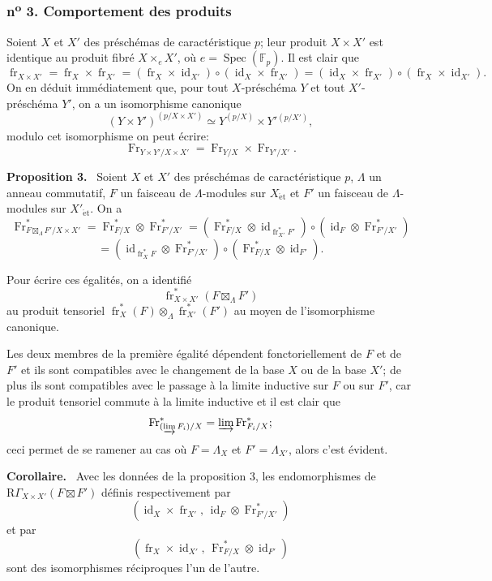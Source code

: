 \documentclass[11pt]{article}
\newenvironment{statement}[1]{\par\medskip\noindent\textbf{#1.}\ }{\par\medskip}
\DeclareMathOperator{\Spec}{Spec}
\newcommand{\R}{\mathrm{R}}\newcommand{\RHomCore}{\mathrm{RHom}}
\providecommand{\et}{\mathrm{\acute{e}t}}
\providecommand{\RGamma}{\R\Gamma}
\providecommand{\id}{\operatorname{id}}
\providecommand{\id}{\operatorname{id}}
\providecommand{\id}{\operatorname{id}}
\providecommand{\RGamma}{\R\Gamma}
\providecommand{\R}{\mathrm R}
\providecommand{\id}{\operatorname{id}}
\providecommand{\Spec}{\operatorname{Spec}}
\providecommand{\Spec}{\operatorname{Spec}}
\providecommand{\id}{\operatorname{id}}
\providecommand{\Spec}{\operatorname{Spec}}
\providecommand{\fr}{\operatorname{fr}}
\providecommand{\Fr}{\operatorname{Fr}}
\providecommand{\Fr}{\operatorname{Fr}}
\providecommand{\fr}{\operatorname{fr}}
\providecommand{\Spec}{\operatorname{Spec}}
\providecommand{\id}{\operatorname{id}}
\providecommand{\RGamma}{\R\Gamma}
\providecommand{\et}{\acute{e}t}
\providecommand{\boxt}{\boxtimes}
\begin{document}
\subsubsection*{n\textsuperscript{o} 3. Comportement des produits}

Soient $X$ et $X'$ des préschémas de caractéristique $p$; leur produit $X\times X'$ est identique au produit fibré $X\times_eX'$, où $e=\Spec(\mathbb F_p)$. Il est clair que
\[
\fr_{X\times X'}=\fr_X\times\fr_{X'}=(\fr_X\times\id_{X'})\circ(\id_X\times\fr_{X'})
=(\id_X\times\fr_{X'})\circ(\fr_X\times\id_{X'}).
\]
On en déduit immédiatement que, pour tout $X$-préschéma $Y$ et tout $X'$-préschéma $Y'$, on a un isomorphisme canonique
\[
(Y\times Y')^{(p/X\times X')}\simeq Y^{(p/X)}\times Y'{}^{(p/X')},
\]
modulo cet isomorphisme on peut écrire:
\[
\Fr_{Y\times Y'/X\times X'}=\Fr_{Y/X}\times\Fr_{Y'/X'}.
\]

\begin{statement}{Proposition 3}
Soient $X$ et $X'$ des préschémas de caractéristique $p$, $\Lambda$ un anneau commutatif, $F$ un faisceau de $\Lambda$-modules sur $X_{\et}$ et $F'$ un faisceau de $\Lambda$-modules sur $X'_{\et}$. On a
\[
\Fr^*_{F\boxt_\Lambda F'/X\times X'}
=\Fr^*_{F/X}\otimes\Fr^*_{F'/X'}
=(\Fr^*_{F/X}\otimes\id_{\fr_{X'}^*F'})\circ
(\id_F\otimes\Fr^*_{F'/X'})
\]
\[
=(\id_{\fr_X^*F}\otimes\Fr^*_{F'/X'})\circ
(\Fr^*_{F/X}\otimes\id_{F'}).
\]
\end{statement}

Pour écrire ces égalités, on a identifié
\[
\fr_{X\times X'}^*(F\boxt_\Lambda F')
\]
au produit tensoriel $\fr_X^*(F)\otimes_\Lambda\fr_{X'}^*(F')$ au moyen de l'isomorphisme canonique.

Les deux membres de la première égalité dépendent fonctoriellement de $F$ et de $F'$ et ils sont compatibles avec le changement de la base $X$ ou de la base $X'$; de plus ils sont compatibles avec le passage à la limite inductive sur $F$ ou sur $F'$, car le produit tensoriel commute à la limite inductive et il est clair que
\[
\Fr^*_{(\varinjlim F_i)/X}=\varinjlim\Fr^*_{F_i/X};
\]
ceci permet de se ramener au cas où $F=\Lambda_X$ et $F'=\Lambda_{X'}$, alors c'est évident.

\begin{statement}{Corollaire}
Avec les données de la proposition 3, les endomorphismes de $\RGamma_{X\times X'}(F\boxt F')$ définis respectivement par
\[
(\id_X\times\fr_{X'},\,\id_F\otimes\Fr^*_{F'/X'})
\]
et par
\[
(\fr_X\times\id_{X'},\,\Fr^*_{F/X}\otimes\id_{F'})
\]
sont des isomorphismes réciproques l'un de l'autre.
\end{statement}
\end{document}
